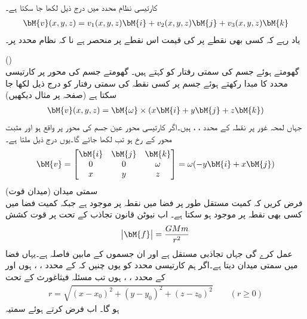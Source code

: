 کارتیسی نظام محدد میں درج ذیل لکھا جا سکتا ہے۔
\begin{align*}
\bM{v}(x,y,z)=v_1(x,y,z)\bM{i}+v_2(x,y,z)\bM{j}+v_3(x,y,z)\bM{k}
\end{align*} 
یاد رہے کہ کسی بھی نقطے پر   کی قیمت  اس نقطے پر منحصر ہے نا کہ نظام محدد پر۔

\quad {} ()\\
گھومتے ہوئے جسم  کی سمتی رفتار  کو  کہتے ہیں۔ گھومتے جسم کی محور پر کارتیسی محدد کا مبدا رکھتے ہوئے جسم پر کسی نقطہ   کی سمتی رفتار کو درج ذیل لکھا جا سکتا ہے (صفحہ  پر مثال  دیکھیں)
\begin{align} 
\bM{v}(x,y,z)=\bM{\omega} \times (x\bM{i}+y\bM{j}+z\bM{k})
\end{align} 
جہاں لمحہ غور پر نقطہ   کے محدد  ، ،  ہیں۔اگر کارتیسی  محور عین جسم کی محور پر واقع ہو اور  مثبت  محور  کے رخ ہو تب  لکھا جائے گا۔یوں درج ذیل ملتا ہے۔
\begin{align}
\bM{v}=\begin{bmatrix} \bM{i}&\bM{j}&\bM{k}\\0&0&\omega\\x&y&z \end{bmatrix}=\omega (-y\bM{i}+x\bM{j})
\end{align}
\quad سمتی میدان (میدان قوت)\\
فرض کریں کہ کمیت   مستقل طور پر فضا میں نقطہ  پر موجود ہے جبکہ کمیت  فضا میں کسی بھی نقطہ  پر موجود ہو سکتا ہے۔ اب نیوٹن قانون تجاذب  کے تحت  پر قوت کشش
\begin{align}
\abs{\bM{f}}=\frac{GMm}{r^2}
\end{align}
عمل کرے گی جہاں  تجاذبی مستقل ہے اور  ان جسموں کے مابین فاصلہ ہے۔یہاں  فضا میں سمتی میدان دیتا ہے۔اگر ہم کارتیسی محدد کو یوں چنیں کہ  کے محدد ، ،  ہوں اور  کے محدد ، ،  ہوں تب مسئلہ فیثاغورث کے تحت 
\begin{align*}
r=\sqrt{(x-x_0)^2+(y-y_0)^2+(z-z_0)^2}\quad \quad (r\ge 0)
\end{align*}
ہو گا۔ اب  فرض کرتے ہوئے سمتیہ 
